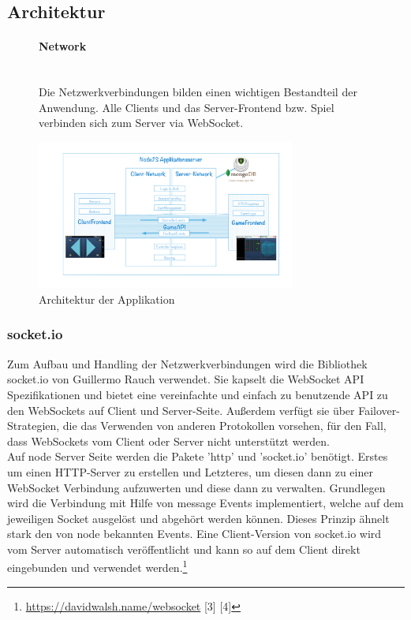 \documentclass[a4paper]{spie}  %
\begin{document}
\subsection{Architektur}
\begin{figure}[H]
	\begin{minipage}[t]{0.4\textwidth}
		\vspace{0pt}
		\paragraph{Network}\mbox{}\\
		Die Netzwerkverbindungen bilden einen wichtigen Bestandteil der Anwendung. Alle Clients und das Server-Frontend bzw. Spiel verbinden sich zum Server via WebSocket.
	\end{minipage}
	\hfill
	\begin{minipage}[t]{0.5\textwidth}
		\vspace{0pt}
		\includegraphics[width=8.5cm]{images/arch/M113.png}
		\caption{Architektur der Applikation}
		\label{fig:test2}
	\end{minipage}
\end{figure}



\subsubsection{socket.io}\label{socketio}
Zum Aufbau und Handling der Netzwerkverbindungen wird die Bibliothek socket.io von Guillermo Rauch verwendet. Sie kapselt die WebSocket API Spezifikationen und bietet eine vereinfachte und einfach zu benutzende API zu den WebSockets auf Client und Server-Seite. Außerdem verfügt sie über Failover-Strategien, die das Verwenden von anderen Protokollen vorsehen, für den Fall, dass WebSockets vom Client oder Server nicht unterstützt werden.\\
Auf node Server Seite werden die Pakete 'http' und 'socket.io' benötigt. Erstes um einen HTTP-Server zu erstellen und Letzteres, um diesen dann zu einer WebSocket Verbindung aufzuwerten und diese dann zu verwalten. Grundlegen wird die Verbindung mit Hilfe von message Events implementiert, welche auf dem jeweiligen Socket ausgelöst und abgehört werden können. Dieses Prinzip ähnelt stark den von node bekannten Events. Eine Client-Version von socket.io wird vom Server automatisch veröffentlicht und kann so auf dem Client direkt eingebunden und
verwendet werden.\footnote{\url{https://davidwalsh.name/websocket} [3] [4]}
\end{document}
